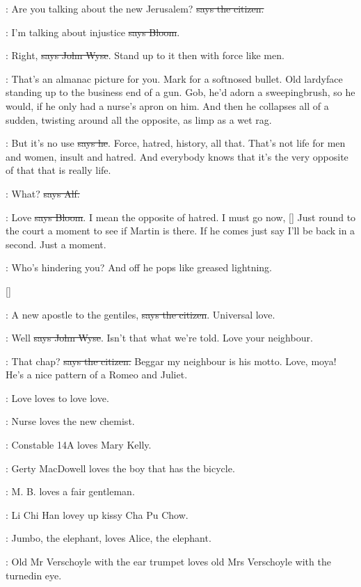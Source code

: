 \citizen:
Are you talking about the new Jerusalem?
\sout{says the citizen.}

\Bloom:
I'm talking about injustice \sout{says Bloom}.

\johnwyse:
Right, \sout{says John Wyse}.
Stand up to it then with force like men.

\Nq:
That's an almanac picture for you. Mark for a softnosed bullet. Old
lardyface standing up to the business end of a gun. Gob, he'd adorn a
sweepingbrush, so he would, if he only had a nurse's apron on him. And
then he collapses all of a sudden, twisting around all the opposite, as
limp as a wet rag.%

\Bloom:
But it's no use \sout{says he}.
Force, hatred, history, all that. That's not
life for men and women, insult and hatred. And everybody knows that it's
the very opposite of that that is really life.

\bergan:
What? \sout{says Alf.}

\Bloom:
Love \sout{says Bloom}.
I mean the opposite of hatred. I must go now,
[]
Just round to the court a moment to see if Martin is there.
If he comes just say I'll be back in a second. Just a moment.

\Nq:
Who's hindering you? And off he pops like greased lightning.

[]

\citizen:
A new apostle to the gentiles, \sout{says the citizen}.
Universal love.

\johnwyse:
Well \sout{says John Wyse}.
Isn't that what we're told.
Love your neighbour.

\citizen:
That chap? \sout{says the citizen.}
Beggar my neighbour is his motto. Love,
moya! He's a nice pattern of a Romeo and Juliet.

:
Love loves to love love.

:
Nurse loves the new chemist. 

:
Constable 14A loves Mary Kelly. 

:
Gerty MacDowell loves the boy that has the bicycle. 

:
M. B. loves a fair gentleman. 

:
Li Chi Han lovey up kissy Cha Pu Chow. 

:
Jumbo, the elephant, loves Alice, the elephant. 

:
Old Mr Verschoyle with the ear trumpet loves
old Mrs Verschoyle with the turnedin eye. 


